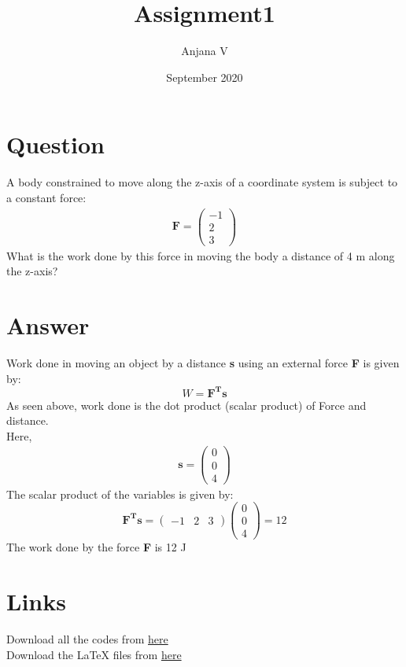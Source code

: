 \documentclass{article}
\title{Assignment1}
\author{Anjana V }
\date{September 2020}
\begin{document}
\maketitle
\section*{Question}
A body constrained to move along the z-axis of a coordinate system is subject to a constant force:
\begin{align*}
\textbf{F}=\begin{pmatrix}
-1\\
2\\
3
\end{pmatrix}    
\end{align*}
What is the work done by this force in moving the body a distance of 4 m along the z-axis?
\section*{Answer}
Work done in moving an object by a distance \textbf{s} using an external force \textbf{F} is given by:
$$W = \mathbf{F^Ts}$$
As seen above, work done is the dot product (scalar product) of Force and distance.
\\Here, 
\begin{align*}
\textbf{s}=\begin{pmatrix}
0\\
0\\
4
\end{pmatrix}    
\end{align*}
The scalar product of the variables is given by:
$$\mathbf{F^Ts} = \begin{pmatrix}
-1 & 2 & 3
\end{pmatrix}\begin{pmatrix}
0\\
0\\
4
\end{pmatrix}=12$$
The work done by the force \textbf{F} is 12 J
\section*{Links}
Download all the codes from \href{https://github.com/anjanavasudevan/grad_schoolwork/blob/master/EE5609/Assignment1/assignment.py}{here} 
\\Download the LaTeX files from \href{https://github.com/anjanavasudevan/grad_schoolwork/tree/master/EE5609/Assignment1/latex}{here}
\end{document}
